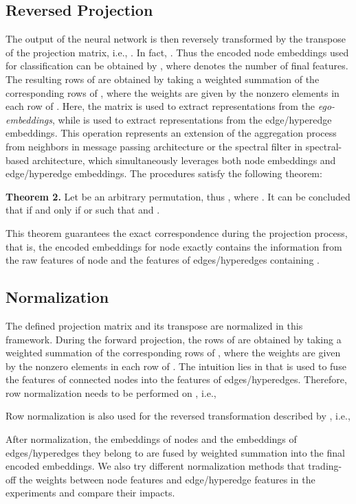 \documentclass[review]{elsarticle}
\begin{document}
\subsection{Reversed Projection}

The output of the neural network  is then reversely transformed by the transpose of the projection matrix, i.e., . In fact, . Thus the encoded node embeddings used for classification can be obtained by , where  denotes the number of final features. The resulting rows of  are obtained by taking a weighted summation of the corresponding rows of , where the weights are given by the nonzero elements in each row of . Here, the matrix  is used to extract representations from the \textit{ego-embeddings}, while  is used to extract representations from the edge/hyperedge embeddings. This operation represents an extension of the aggregation process from neighbors in message passing architecture or the spectral filter in spectral-based architecture, which simultaneously leverages both node embeddings and edge/hyperedge embeddings. The procedures satisfy the following theorem:

\textbf{Theorem 2.} Let  be an arbitrary permutation, thus , where . It can be concluded that  if and only if  or  such that  and .

This theorem guarantees the exact correspondence during the projection process, that is, the encoded embeddings for node  exactly contains the information from the raw features of node  and the features of edges/hyperedges containing .

\subsection{Normalization}

The defined projection matrix and its transpose are normalized in this framework. During the forward projection, the rows of  are obtained by taking a weighted summation of the corresponding rows of , where the weights are given by the nonzero elements in each row of . The intuition lies in that  is used to fuse the features of connected nodes into the features of edges/hyperedges. Therefore, row normalization needs to be performed on , i.e.,

Row normalization is also used for the reversed transformation described by , i.e.,

After normalization, the embeddings of nodes and the embeddings of edges/hyperedges they belong to are fused by weighted summation into the final encoded embeddings. We also try different normalization methods that trading-off the weights between node features and edge/hyperedge features in the experiments and compare their impacts.
\end{document}
